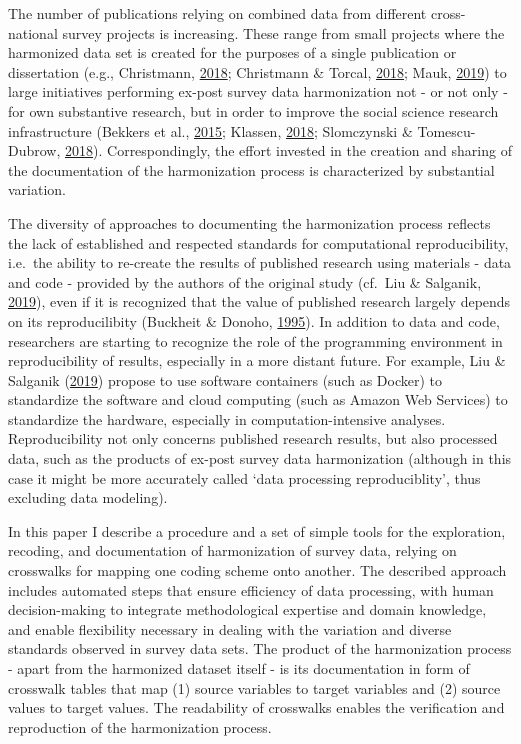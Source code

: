 \documentclass[12pt,]{article}
\begin{document}
The number of publications relying on combined data from different cross-national survey projects is increasing. These range from small projects where the harmonized data set is created for the purposes of a single publication or dissertation (e.g., Christmann, \protect\hyperlink{ref-Christmann2018}{2018}; Christmann \& Torcal, \protect\hyperlink{ref-Christmann2018a}{2018}; Mauk, \protect\hyperlink{ref-Mauk2019}{2019}) to large initiatives performing ex-post survey data harmonization not - or not only - for own substantive research, but in order to improve the social science research infrastructure (Bekkers et al., \protect\hyperlink{ref-Bekkers2015}{2015}; Klassen, \protect\hyperlink{ref-Klassen2018}{2018}; Slomczynski \& Tomescu-Dubrow, \protect\hyperlink{ref-Slomczynski2018}{2018}). Correspondingly, the effort invested in the creation and sharing of the documentation of the harmonization process is characterized by substantial variation.

The diversity of approaches to documenting the harmonization process reflects the lack of established and respected standards for computational reproducibility, i.e.~the ability to re-create the results of published research using materials - data and code - provided by the authors of the original study (cf.~Liu \& Salganik, \protect\hyperlink{ref-Liu2019}{2019}), even if it is recognized that the value of published research largely depends on its reproducilibity (Buckheit \& Donoho, \protect\hyperlink{ref-Buckheit1995}{1995}). In addition to data and code, researchers are starting to recognize the role of the programming environment in reproducibility of results, especially in a more distant future. For example, Liu \& Salganik (\protect\hyperlink{ref-Liu2019}{2019}) propose to use software containers (such as Docker) to standardize the software and cloud computing (such as Amazon Web Services) to standardize the hardware, especially in computation-intensive analyses. Reproducibility not only concerns published research results, but also processed data, such as the products of ex-post survey data harmonization (although in this case it might be more accurately called `data processing reproduciblity', thus excluding data modeling).

In this paper I describe a procedure and a set of simple tools for the exploration, recoding, and documentation of harmonization of survey data, relying on crosswalks for mapping one coding scheme onto another. The described approach includes automated steps that ensure efficiency of data processing, with human decision-making to integrate methodological expertise and domain knowledge, and enable flexibility necessary in dealing with the variation and diverse standards observed in survey data sets. The product of the harmonization process - apart from the harmonized dataset itself - is its documentation in form of crosswalk tables that map (1) source variables to target variables and (2) source values to target values. The readability of crosswalks enables the verification and reproduction of the harmonization process.
\end{document}
